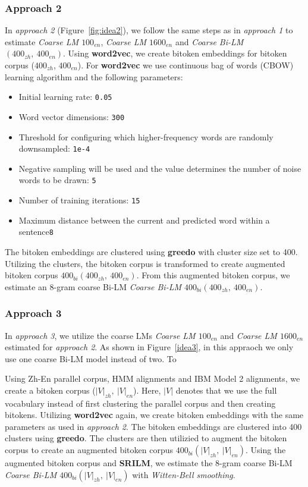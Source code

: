 \subsubsection{Approach 2}
In \textit{approach 2} (Figure~\ref{fig:idea2}), we follow the same steps as in \textit{approach 1} to estimate \textit{Coarse LM $100_{en}$}, \textit{Coarse LM $1600_{en}$} and \textit{Coarse Bi-LM $(400_{zh},\ 400_{en})$}. Using \textbf{word2vec}, we create bitoken embeddings for bitoken corpus ($400_{zh}$, $400_{en}$). For \textbf{word2vec} we use continuous bag of words (CBOW) learning algorithm and the following parameters:
\begin{itemize}
	\item Initial learning rate: \texttt{0.05}
	\item Word vector dimensions: \texttt{300}
	\item Threshold for configuring which higher-frequency words are randomly downsampled: \texttt{1e-4}
	\item Negative sampling will be used and the value determines the number of noise words to be drawn: \texttt{5}
	\item Number of training iterations: \texttt{15}
	\item Maximum distance between the current and predicted word within a sentence\texttt{8}
\end{itemize}

The bitoken embeddings are clustered using \textbf{greedo} with cluster size set to 400. Utilizing the clusters, the bitoken corpus is transformed to create augmented bitoken corpus $400_{bi}(400_{zh},\ 400_{en})$. From this augmented bitoken corpus, we estimate an 8-gram coarse Bi-LM \textit{Coarse Bi-LM $400_{bi}(400_{zh},\ 400_{en})$}.

\subsubsection{Approach 3}
In \textit{approach 3}, we utilize the coarse LMs \textit{Coarse LM $100_{en}$} and \textit{Coarse LM $1600_{en}$} estimated for \textit{approach 2}. As shown in Figure~\ref{idea3}, in this appraoch we only use one coarse Bi-LM model instead of two. To

Using Zh-En parallel corpus, HMM alignments and IBM Model 2 alignments, we create a bitoken corpus ($|V|_{zh},\ |V|_{en}$). Here, $|V|$ denotes that we use the full vocabulary instead of first clustering the parallel corpus and then creating bitokens. Utilizing \textbf{word2vec} again, we create bitoken embeddings with the same parameters as used in \textit{approach 2}. The bitoken embeddings are clustered into 400 clusters using \textbf{greedo}. The clusters are then utilizied to augment the bitoken corpus to create an augmented bitoken corpus \textit{$400_{bi}(|V|_{zh},\ |V|_{en})$}. Using the augmented bitoken corpus and \textbf{SRILM}, we estimate the 8-gram coarse Bi-LM \textit{Coarse Bi-LM $400_{bi}(|V|_{zh},\ |V|_{en})$} with \textit{Witten-Bell smoothing}.

